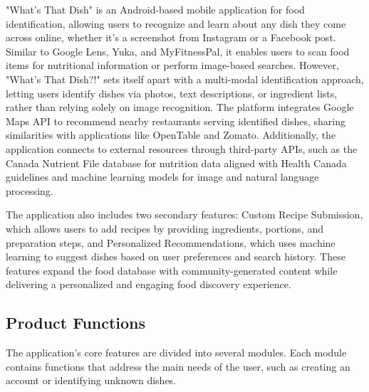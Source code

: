 \documentclass[]{article}
\begin{document}
"What’s That Dish" is an Android-based mobile application for food identification, allowing users to recognize and learn about any dish they come across online, whether it's a screenshot from Instagram or a Facebook post. Similar to Google Lens, Yuka, and MyFitnessPal, it enables users to scan food items for nutritional information or perform image-based searches. However, "What’s That Dish?!" sets itself apart with a multi-modal identification approach, letting users identify dishes via photos, text descriptions, or ingredient lists, rather than relying solely on image recognition. The platform integrates Google Maps API to recommend nearby restaurants serving identified dishes, sharing similarities with applications like OpenTable and Zomato. Additionally, the application connects to external resources through third-party APIs, such as the Canada Nutrient File database for nutrition data aligned with Health Canada guidelines and machine learning models for image and natural language processing.

The application also includes two secondary features: Custom Recipe Submission, which allows users to add recipes by providing ingredients, portions, and preparation steps, and Personalized Recommendations, which uses machine learning to suggest dishes based on user preferences and search history. These features expand the food database with community-generated content while delivering a personalized and engaging food discovery experience.


\subsection{Product Functions}
\label{sub:product_functions}

The application's core features are divided into several modules. Each module contains functions that address the main needs of the user, such as creating an account or identifying unknown dishes.
\end{document}
